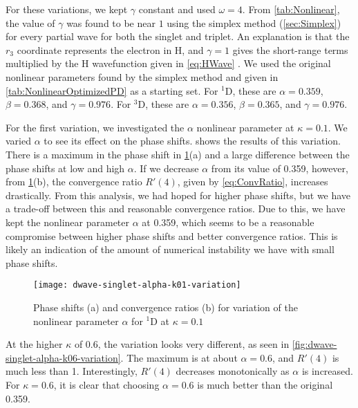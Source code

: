 \documentclass[Dissertation.tex]{subfiles}
\begin{document}
For these variations, we kept $\gamma$ constant and used $\omega = 4$. From 
\cref{tab:Nonlinear}, the value of $\gamma$ was found to be near $1$ using 
the simplex method (\cref{sec:Simplex}) for every partial wave for both the 
singlet and triplet. An explanation is that the $r_3$ coordinate represents 
the electron in H, and $\gamma = 1$ gives the short-range terms multiplied by 
the H wavefunction given in \cref{eq:HWave} \cite{VanReethPrivate}. We used the
original nonlinear parameters found by the simplex method and given in
\cref{tab:NonlinearOptimizedPD} as a starting set. For
$^1$D, these are $\alpha = 0.359$, $\beta = 0.368$, and $\gamma = 0.976$. For
$^3$D, these are $\alpha = 0.356$, $\beta = 0.365$, and $\gamma = 0.976$.

For the first variation, we investigated the $\alpha$ nonlinear parameter at
$\kappa = 0.1$. We varied $\alpha$ to see its effect on the phase shifts.
 shows the results of this
variation. There is a maximum in the phase shift in 
\cref{fig:dwave-singlet-alpha-k01-variation}(a) and a large difference between
the phase shifts at low and high $\alpha$. If we decrease
$\alpha$ from its value of 0.359, however, from
\cref{fig:dwave-singlet-alpha-k01-variation}(b),
the convergence ratio $R'(4)$, given by \cref{eq:ConvRatio},
increases drastically. From this analysis, we had hoped for higher phase shifts,
but we have a trade-off between this and reasonable convergence ratios. Due to
this, we have kept the nonlinear parameter $\alpha$ at 0.359, which seems to be
a reasonable compromise between higher phase shifts and better convergence
ratios. This is likely an indication of the amount of numerical instability
we have with small phase shifts.


\begin{figure}
	\centering
	\texttt{[image: dwave-singlet-alpha-k01-variation]}
	\caption[Variation of the nonlinear parameter $\alpha$ for $^{1}$D at $\kappa = 0.1$]{Phase shifts (a) and convergence ratios (b) for variation of the nonlinear parameter $\alpha$ for $^{1}$D at $\kappa = 0.1$}
	\label{fig:dwave-singlet-alpha-k01-variation}
\end{figure}

At the higher $\kappa$ of 0.6, the variation looks very different, as seen in
\cref{fig:dwave-singlet-alpha-k06-variation}. The maximum is at about
$\alpha = 0.6$, and $R'(4)$ is much less than 1. Interestingly,
$R'(4)$ decreases monotonically as $\alpha$ is increased. For
$\kappa = 0.6$, it is clear that choosing $\alpha = 0.6$ is much better than
the original 0.359.
\end{document}
